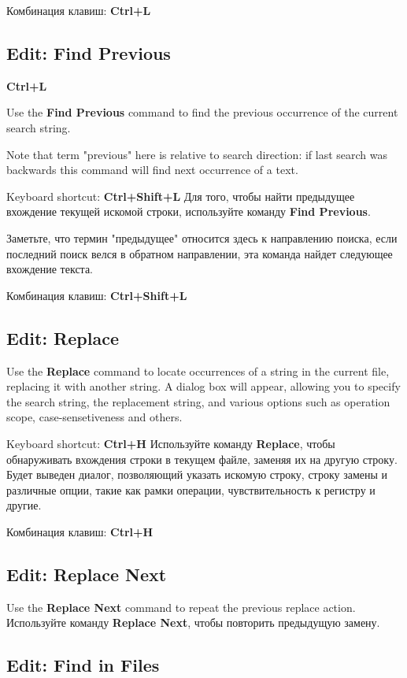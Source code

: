 Комбинация клавиш: {\bf Ctrl+L}
\fi
\subsection{Edit: Find Previous}
 {\bf Ctrl+L}

\ifenglish
Use the {\bf Find Previous} command to find the previous occurrence
of the current search string.

Note that term "previous" here is relative to search direction: if last search was
backwards this command will find next occurrence of a text.

Keyboard shortcut: {\bf Ctrl+Shift+L}
\else
Для того, чтобы найти предыдущее вхождение текущей искомой строки, 
используйте команду {\bf Find Previous}. 

Заметьте, что термин "предыдущее" относится здесь к направлению поиска, если
последний поиск велся в обратном направлении, эта команда найдет следующее
вхождение текста.

Комбинация клавиш: {\bf Ctrl+Shift+L}
\fi
\subsection{Edit: Replace}

\ifenglish
Use the {\bf Replace} command to locate occurrences of a string in
the current file, replacing it with another string. 
A dialog box will appear, allowing you to
specify the search string, the replacement string, and various options such as
operation scope, case-sensetiveness and others.

Keyboard shortcut: {\bf Ctrl+H}
\else
Используйте команду {\bf Replace}, чтобы обнаруживать вхождения строки
в текущем файле, заменяя их на другую строку.
Будет выведен диалог, позволяющий указать искомую строку, строку замены и 
различные опции, такие как рамки операции, чувствительность к регистру и другие.

Комбинация клавиш: {\bf Ctrl+H}
\fi
\subsection{Edit: Replace Next}

\ifenglish
Use the {\bf Replace Next} command to repeat the previous replace
action.
\else
Используйте команду {\bf Replace Next}, чтобы повторить предыдущую замену.
\fi
\subsection{Edit: Find in Files}

